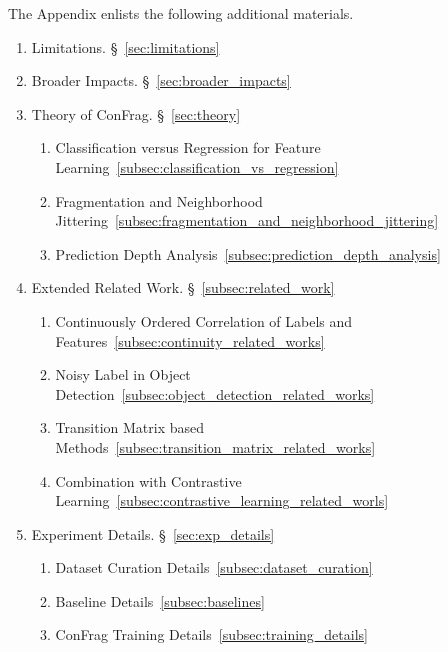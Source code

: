 \documentclass{article}
\theoremstyle{plain}
\theoremstyle{definition}
\theoremstyle{remark}
\begin{document}
The Appendix enlists the following additional materials. %
\begin{enumerate}[label=\Roman*.]
    \item Limitations. \S~\ref{sec:limitations}
    \item Broader Impacts. \S~\ref{sec:broader_impacts}
    \item Theory of ConFrag. \S~\ref{sec:theory}
        \begin{enumerate}[label=\roman*.]
            \item Classification versus Regression for Feature Learning~\ref{subsec:classification_vs_regression}
            \item Fragmentation and Neighborhood Jittering~\ref{subsec:fragmentation_and_neighborhood_jittering}
            \item Prediction Depth Analysis~\ref{subsec:prediction_depth_analysis}
        \end{enumerate}
    \item Extended Related Work. \S~\ref{subsec:related_work}
        \begin{enumerate}[label=\roman*.]
            \item Continuously Ordered Correlation of Labels and Features~\ref{subsec:continuity_related_works}
            \item Noisy Label in Object Detection~\ref{subsec:object_detection_related_works}
            \item Transition Matrix based Methods~\ref{subsec:transition_matrix_related_works}
            \item Combination with Contrastive Learning~\ref{subsec:contrastive_learning_related_worls}
        \end{enumerate}
    \item Experiment Details. \S~\ref{sec:exp_details}
        \begin{enumerate}[label=\roman*.]
            \item Dataset Curation Details~\ref{subsec:dataset_curation}
            \item Baseline Details~\ref{subsec:baselines}
            \item ConFrag Training Details~\ref{subsec:training_details}

\end{enumerate}
\end{enumerate}
\end{document}
